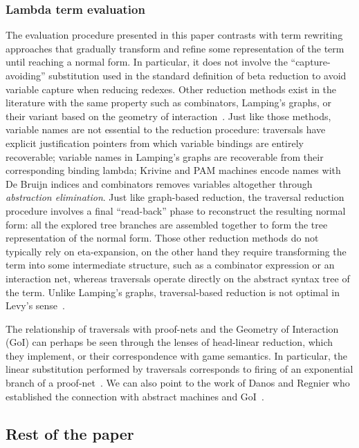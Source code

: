 \documentclass{elsarticle}
\theoremstyle{plain}
\theoremstyle{definition}
\begin{document}
\subsubsection{Lambda term evaluation}
The evaluation procedure presented in this paper contrasts with term rewriting approaches that gradually transform and refine some representation of the term until reaching a normal form. In particular, it does not involve the ``capture-avoiding'' substitution used in the standard definition of beta reduction to avoid variable capture when reducing redexes. Other reduction methods exist in the literature with the same property such as combinators, Lamping's graphs, or their variant based on the geometry of interaction~\cite{Lamping:1989:AOL:96709.96711, Gonthier:1992:GOL:143165.143172, curry_combinatorylogic, Barendregt84, the-implementation-of-functional-programming-languages}.
Just like those methods, variable names are not essential to the reduction procedure: traversals have explicit justification pointers from which variable bindings are entirely recoverable; variable names in Lamping's graphs are recoverable from their corresponding binding lambda;
Krivine and PAM machines encode names with De Bruijn indices
and combinators removes variables altogether through \emph{abstraction elimination}.
Just like graph-based reduction, the traversal reduction procedure involves a final ``read-back'' phase to reconstruct the resulting normal form: all the explored tree branches are assembled together to form the tree representation of the normal form. Those other reduction methods do not typically rely on eta-expansion, on the other hand they require transforming the term into some intermediate structure, such as a combinator expression or an interaction net, whereas traversals operate directly on the abstract syntax tree of the term. Unlike Lamping's graphs, traversal-based reduction is not optimal in Levy's sense~\cite{optimal-reduction-levy}.

The relationship of traversals with proof-nets and the Geometry of Interaction (GoI) can perhaps be seen through the lenses of head-linear reduction, which they implement, or their correspondence with game semantics. In particular, the linear substitution performed by traversals corresponds to firing of an exponential branch of a proof-net~\cite{MASCARI1994111}. We can also point to the work of Danos and Regnier who established the connection with abstract machines and GoI~\cite{danosherbelinregnier1996}.

\subsection{Rest of the paper}
\end{document}
